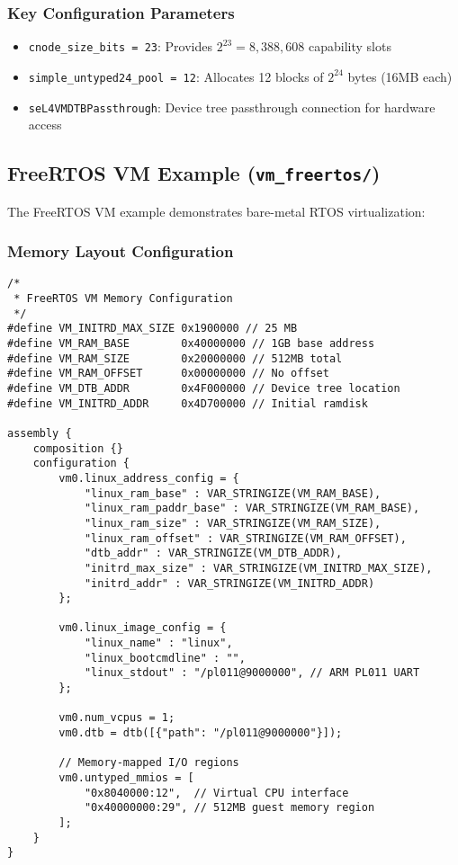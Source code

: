 \documentclass[12pt,a4paper]{article}
\begin{document}
\subsubsection{Key Configuration Parameters}
\begin{itemize}
    \item \texttt{cnode\_size\_bits = 23}: Provides $2^{23} = 8,388,608$ capability slots
    \item \texttt{simple\_untyped24\_pool = 12}: Allocates 12 blocks of $2^{24}$ bytes (16MB each)
    \item \texttt{seL4VMDTBPassthrough}: Device tree passthrough connection for hardware access
\end{itemize}

\subsection{FreeRTOS VM Example (\texttt{vm\_freertos/})}

The FreeRTOS VM example demonstrates bare-metal RTOS virtualization:

\subsubsection{Memory Layout Configuration}

\begin{lstlisting}[style=camkes]
/*
 * FreeRTOS VM Memory Configuration
 */
#define VM_INITRD_MAX_SIZE 0x1900000 // 25 MB
#define VM_RAM_BASE        0x40000000 // 1GB base address
#define VM_RAM_SIZE        0x20000000 // 512MB total
#define VM_RAM_OFFSET      0x00000000 // No offset
#define VM_DTB_ADDR        0x4F000000 // Device tree location
#define VM_INITRD_ADDR     0x4D700000 // Initial ramdisk

assembly {
    composition {}
    configuration {
        vm0.linux_address_config = {
            "linux_ram_base" : VAR_STRINGIZE(VM_RAM_BASE),
            "linux_ram_paddr_base" : VAR_STRINGIZE(VM_RAM_BASE),
            "linux_ram_size" : VAR_STRINGIZE(VM_RAM_SIZE),
            "linux_ram_offset" : VAR_STRINGIZE(VM_RAM_OFFSET),
            "dtb_addr" : VAR_STRINGIZE(VM_DTB_ADDR),
            "initrd_max_size" : VAR_STRINGIZE(VM_INITRD_MAX_SIZE),
            "initrd_addr" : VAR_STRINGIZE(VM_INITRD_ADDR)
        };

        vm0.linux_image_config = {
            "linux_name" : "linux",
            "linux_bootcmdline" : "",
            "linux_stdout" : "/pl011@9000000", // ARM PL011 UART
        };

        vm0.num_vcpus = 1;
        vm0.dtb = dtb([{"path": "/pl011@9000000"}]);
        
        // Memory-mapped I/O regions
        vm0.untyped_mmios = [
            "0x8040000:12",  // Virtual CPU interface
            "0x40000000:29", // 512MB guest memory region
        ];
    }
}
\end{lstlisting}
\end{document}
